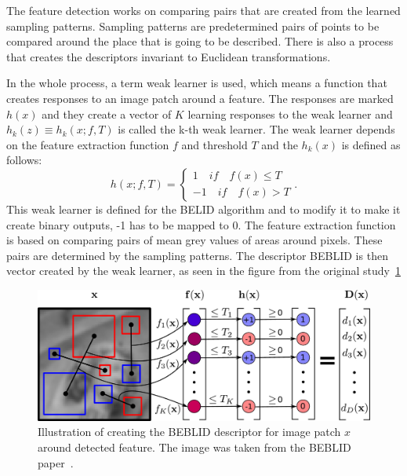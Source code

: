\documentclass[thesis=B,english]{FITthesis}[2019/12/23]
\begin{document}
            The feature detection works on comparing pairs that are created from the learned sampling patterns. Sampling patterns are predetermined pairs of points to be compared around the place that is going to be described. There is also a process that creates the descriptors invariant to Euclidean transformations.
            
            In the whole process, a term weak learner is used, which means a function that creates responses to an image patch around a feature. The responses are marked \(h(x)\) and they create a vector of \(K\) learning responses to the weak learner and \(h_k(z) \equiv h_k(x; f, T)\) is called the k-th weak learner. The weak learner depends on the feature extraction function \(f\) and threshold \(T\) and the \(h_k(x)\) is defined as follows:
            \begin{equation}
                h(x; f, T) =
                \begin{cases}
                    1\quad if \quad f(x) \leq T\\
                    -1\quad if \quad f(x) > T
                \end{cases}.
            \end{equation}
            This weak learner is defined for the BELID algorithm and to modify it to make it create binary outputs, -1 has to be mapped to 0. The feature extraction function is based on comparing pairs of mean grey values of areas around pixels. These pairs are determined by the sampling patterns. The descriptor BEBLID is then vector created by the weak learner, as seen in the figure from the original study~\ref{fig:BEBLID_explanation}
            
            \begin{figure}
                \centering
                \includegraphics[width = 0.8\linewidth] {pictures/features_and_descriptors/BEBLID_explanation.jpg}
                \caption[Illustration of creating the BEBLID descriptor]{Illustration of creating the BEBLID descriptor for image patch \(x\) around detected feature. The image was taken from the BEBLID paper~\cite{SUAREZ2020_paper}.}
                \label{fig:BEBLID_explanation}
            \end{figure}
            
\end{document}

